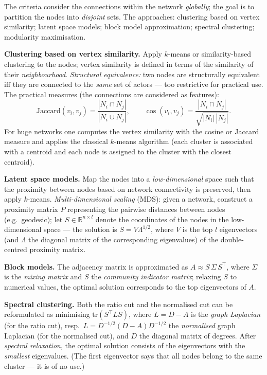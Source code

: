 \documentclass[11pt,a4paper]{article}
\theoremstyle{definition}
\begin{document}
\begin{defbox}
The criteria consider the connections within the network \emph{globally}; the goal is to partition the
nodes into \emph{disjoint} sets. The approaches: clustering based on vertex similarity; latent space
models; block model approximation; spectral clustering; modularity maximisation.

\textbf{Clustering based on vertex similarity.} Apply $k$-means or similarity-based clustering to the
nodes; vertex similarity is defined in terms of the similarity of their \emph{neighbourhood}.
\emph{Structural equivalence:} two nodes are structurally equivalent iff they are connected to the
\emph{same} set of actors --- too restrictive for practical use. The practical measures (the
connections are considered as features):
\[ \mathrm{Jaccard}(v_i,v_j)=\frac{|N_i\cap N_j|}{|N_i\cup N_j|},\qquad
   \cos(v_i,v_j)=\frac{|N_i\cap N_j|}{\sqrt{|N_i|\,|N_j|}}. \]
For huge networks one computes the vertex similarity with the cosine or Jaccard measure and applies the
classical $k$-means algorithm (each cluster is associated with a centroid and each node is assigned to
the cluster with the closest centroid).

\textbf{Latent space models.} Map the nodes into a \emph{low-dimensional} space such that the proximity
between nodes based on network connectivity is preserved, then apply $k$-means.
\emph{Multi-dimensional scaling} (MDS): given a network, construct a proximity matrix $P$ representing
the pairwise distances between nodes (e.g.\ geodesic); let $S\in\mathbb R^{n\times l}$ denote the
coordinates of the nodes in the low-dimensional space --- the solution is $S=V\Lambda^{1/2}$, where $V$
is the top $l$ eigenvectors (and $\Lambda$ the diagonal matrix of the corresponding eigenvalues) of the
double-centred proximity matrix.

\textbf{Block models.} The adjacency matrix is approximated as $A\approx S\,\Sigma\,S^{\!\top}$, where
$\Sigma$ is the \emph{mixing matrix} and $S$ the \emph{community indicator matrix}; relaxing $S$ to
numerical values, the optimal solution corresponds to the top eigenvectors of $A$.

\textbf{Spectral clustering.} Both the ratio cut and the normalised cut can be reformulated as
minimising $\mathrm{tr}(S^{\!\top}LS)$, where $L=D-A$ is the \emph{graph Laplacian} (for the ratio
cut), resp.\ $L=D^{-1/2}(D-A)D^{-1/2}$ the \emph{normalised} graph Laplacian (for the normalised cut),
and $D$ the diagonal matrix of degrees. After \emph{spectral relaxation}, the optimal solution consists
of the eigenvectors with the \emph{smallest} eigenvalues. (The first eigenvector says that all nodes
belong to the same cluster --- it is of no use.)


\end{defbox}
\end{document}
